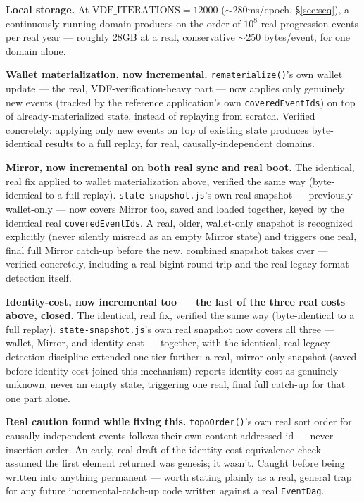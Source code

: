 \documentclass[10pt]{article}
\newcommand{\code}[1]{\texttt{\small #1}}
\begin{document}
\textbf{Local storage.} At $\mathrm{VDF\_ITERATIONS} = 12000$ ($\sim$280ms/epoch, \S\ref{sec:seq}), a continuously-running domain produces on the order of $10^8$ real progression events per real year --- roughly 28GB at a real, conservative $\sim$250 bytes/event, for one domain alone.

\textbf{Wallet materialization, now incremental.} \code{rematerialize()}'s own wallet update --- the real, VDF-verification-heavy part --- now applies only genuinely new events (tracked by the reference application's own \code{coveredEventIds}) on top of already-materialized state, instead of replaying from scratch. Verified concretely: applying only new events on top of existing state produces byte-identical results to a full replay, for real, causally-independent domains.

\textbf{Mirror, now incremental on both real sync and real boot.} The identical, real fix applied to wallet materialization above, verified the same way (byte-identical to a full replay). \code{state-snapshot.js}'s own real snapshot --- previously wallet-only --- now covers Mirror too, saved and loaded together, keyed by the identical real \code{coveredEventIds}. A real, older, wallet-only snapshot is recognized explicitly (never silently misread as an empty Mirror state) and triggers one real, final full Mirror catch-up before the new, combined snapshot takes over --- verified concretely, including a real bigint round trip and the real legacy-format detection itself.

\textbf{Identity-cost, now incremental too --- the last of the three real costs above, closed.} The identical, real fix, verified the same way (byte-identical to a full replay). \code{state-snapshot.js}'s own real snapshot now covers all three --- wallet, Mirror, and identity-cost --- together, with the identical, real legacy-detection discipline extended one tier further: a real, mirror-only snapshot (saved before identity-cost joined this mechanism) reports identity-cost as genuinely unknown, never an empty state, triggering one real, final full catch-up for that one part alone.

\textbf{Real caution found while fixing this.} \code{topoOrder()}'s own real sort order for causally-independent events follows their own content-addressed id --- never insertion order. An early, real draft of the identity-cost equivalence check assumed the first element returned was genesis; it wasn't. Caught before being written into anything permanent --- worth stating plainly as a real, general trap for any future incremental-catch-up code written against a real \code{EventDag}.
\end{document}
